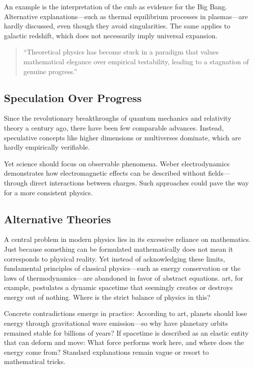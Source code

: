 An example is the interpretation of the \gls{cmb} as evidence for the Big Bang. Alternative explanations—such as thermal equilibrium processes in plasmas—are hardly discussed, even though they
avoid singularities. The same applies to galactic redshift, which does not necessarily imply universal expansion.
\begin{quote}
    \enquote{Theoretical physics has become stuck in a paradigm that values mathematical elegance over empirical testability, leading to a stagnation of genuine progress.} \cite{Smolin2006}
\end{quote}

\subsection{Speculation Over Progress}
Since the revolutionary breakthroughs of quantum mechanics and relativity theory a century ago, there have been few comparable advances. Instead, speculative concepts like
higher dimensions or multiverses dominate, which are hardly empirically verifiable.

Yet science should focus on observable phenomena. Weber electrodynamics demonstrates how electromagnetic effects can be described without fields—through direct
interactions between charges. Such approaches could pave the way for a more consistent physics.

\subsection{Alternative Theories}
A central problem in modern physics lies in its excessive reliance on mathematics. Just because something can be formulated mathematically
does not mean it corresponds to physical reality. Yet instead of acknowledging these limits, fundamental principles of classical physics—such as energy conservation
or the laws of thermodynamics—are abandoned in favor of abstract equations. \gls{art}, for example, postulates a dynamic spacetime that seemingly creates or destroys energy
out of nothing. Where is the strict balance of physics in this?

Concrete contradictions emerge in practice: According to \gls{art}, planets should lose energy through gravitational wave emission—so why have planetary orbits remained
stable for billions of years? If spacetime is described as an elastic entity that can deform and move: What force performs work here, and where does the energy come from?
Standard explanations remain vague or resort to mathematical tricks.

